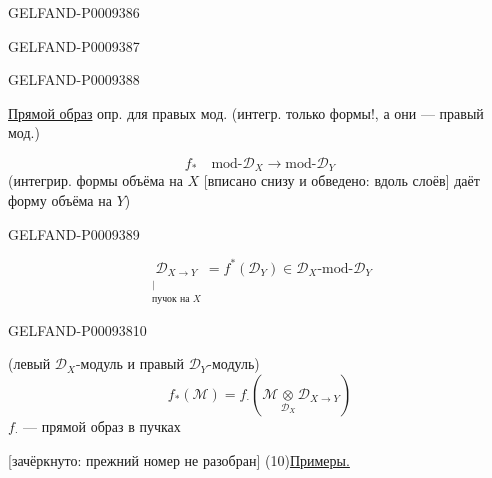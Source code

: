 \begin{GelfandAdjacentEvidence}{GELFAND-P000938}{6}


\end{GelfandAdjacentEvidence}
\begin{GelfandAdjacentEvidence}{GELFAND-P000938}{7}

\end{GelfandAdjacentEvidence}
\begin{GelfandAdjacentEvidence}{GELFAND-P000938}{8}


\underline{Прямой образ} опр. для правых мод. (интегр. только формы!, а они --- правый мод.)

\[
 f_*\quad\text{mod-}\mathcal D_X\longrightarrow\text{mod-}\mathcal D_Y
\]
(интегрир. формы объёма на $X$ [вписано снизу и обведено: вдоль слоёв] даёт форму объёма на $Y$)
\end{GelfandAdjacentEvidence}
\begin{GelfandAdjacentEvidence}{GELFAND-P000938}{9}


\begin{equation*}
 \underset{\substack{\vert\\\text{пучок на }X}}{\mathcal D_{X\to Y}}
 = f^*(\mathcal D_Y)\in\mathcal D_X\text{-mod-}\mathcal D_Y
 \tag{8}
\end{equation*}
\end{GelfandAdjacentEvidence}
\begin{GelfandAdjacentEvidence}{GELFAND-P000938}{10}


(левый $\mathcal D_X$-модуль и правый $\mathcal D_Y$-модуль)
\begin{equation*}
 f_*(\mathcal M)=f_{\cdot}\left(\mathcal M\mathbin{\underset{\mathcal D_X}{\otimes}}\mathcal D_{X\to Y}\right)
 \tag{9}
\end{equation*}
$f_{\cdot}$ --- прямой образ в пучках

[зачёркнуто: прежний номер не разобран] (10)\quad \underline{Примеры.}
\end{GelfandAdjacentEvidence}
